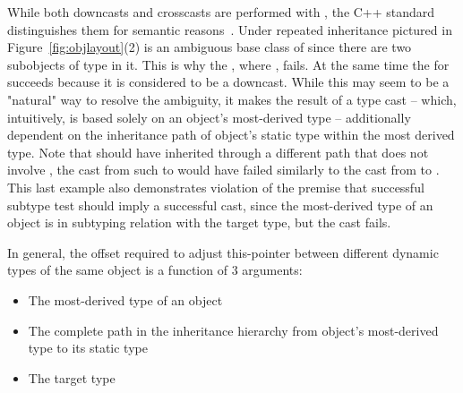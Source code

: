 While both downcasts and crosscasts are performed with , the 
C++ standard distinguishes them for semantic reasons~\cite[.7(8)]{C++11}. 
Under repeated inheritance pictured in Figure~\ref{fig:objlayout}(2)  is 
an ambiguous base class of  since there are two subobjects of type 
 in it. This is why the , where , 
fails. At the same time the  for  
succeeds because it is considered to be a downcast. While this may seem to be a 
"natural" way to resolve the ambiguity, it makes the result of a type cast -- 
which, intuitively, is based solely on an object's most-derived type -- 
additionally dependent on the inheritance path of object's static type within 
the most derived type. Note that should have  inherited  through 
a different path that does not involve , the cast from such  to 
 would have failed similarly to the cast from  to .
This last example also demonstrates violation of the premise that successful 
subtype test should imply a successful cast, since the most-derived type of an 
object is in subtyping relation with the target type, but the cast fails.

In general, the offset required to adjust this-pointer between different dynamic 
types of the same object is a function of 3 arguments:

\begin{itemize}
\setlength{\itemsep}{0pt}
\setlength{\parskip}{0pt}
\item The most-derived type  of an object
\item The complete path in the inheritance hierarchy from object's most-derived 
      type  to its static type 
\item The target type 
\end{itemize}

